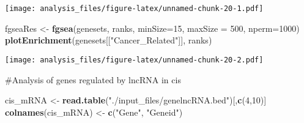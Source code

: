 \documentclass[]{article}
\newenvironment{Shaded}{\begin{snugshade}}{\end{snugshade}}
\newcommand{\DataTypeTok}[1]{\textcolor[rgb]{0.13,0.29,0.53}{#1}}
\newcommand{\DecValTok}[1]{\textcolor[rgb]{0.00,0.00,0.81}{#1}}
\newcommand{\KeywordTok}[1]{\textcolor[rgb]{0.13,0.29,0.53}{\textbf{#1}}}
\newcommand{\NormalTok}[1]{#1}
\newcommand{\OperatorTok}[1]{\textcolor[rgb]{0.81,0.36,0.00}{\textbf{#1}}}
\newcommand{\StringTok}[1]{\textcolor[rgb]{0.31,0.60,0.02}{#1}}
\begin{document}
\begin{Shaded}
\end{Shaded}

\texttt{[image: analysis\_files/figure-latex/unnamed-chunk-20-1.pdf]}

\begin{Shaded}
\begin{Highlighting}[]
\NormalTok{fgseaRes <-}\StringTok{ }\KeywordTok{fgsea}\NormalTok{(genesets, ranks, }\DataTypeTok{minSize=}\DecValTok{15}\NormalTok{, }\DataTypeTok{maxSize =} \DecValTok{500}\NormalTok{, }\DataTypeTok{nperm=}\DecValTok{1000}\NormalTok{)}
\KeywordTok{plotEnrichment}\NormalTok{(genesets[[}\StringTok{"Cancer_Related"}\NormalTok{]], ranks)}
\end{Highlighting}
\end{Shaded}

\texttt{[image: analysis\_files/figure-latex/unnamed-chunk-20-2.pdf]}

\#Analysis of genes regulated by lncRNA in cis

\begin{Shaded}
\begin{Highlighting}[]
\NormalTok{cis_mRNA <-}\StringTok{ }\KeywordTok{read.table}\NormalTok{(}\StringTok{"./input_files/genelncRNA.bed"}\NormalTok{)[,}\KeywordTok{c}\NormalTok{(}\DecValTok{4}\NormalTok{,}\DecValTok{10}\NormalTok{)]}
\KeywordTok{colnames}\NormalTok{(cis_mRNA) <-}\StringTok{ }\KeywordTok{c}\NormalTok{(}\StringTok{"Gene"}\NormalTok{, }\StringTok{"Geneid"}\NormalTok{)}
\end{Highlighting}
\end{Shaded}

\begin{Shaded}
\end{Shaded}
\end{document}
